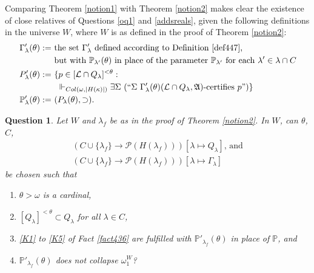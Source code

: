 \documentclass[12pt, twoside]{memoir}
\numberwithin{equation}{section}
\newtheorem{ques}[thm]{Question}
\theoremstyle{definition}
\theoremstyle{remark}
\theoremstyle{definition}
\theoremstyle{definition}
\theoremstyle{definition}
\theoremstyle{remark}
\begin{document}
Comparing Theorem \ref{notion1} with Theorem \ref{notion2} makes clear the existence of close relatives of Questions \ref{oq1} and \ref{addsreals}, given the following definitions in the universe $W$, where $W$ is as defined in the proof of Theorem \ref{notion2}:
\begin{align*}
    \Gamma'_{\lambda}(\theta) := \ & \text{the set } \Gamma'_{\lambda} \text{ defined according to Definition \ref{def447},} \\
    & \text{but with } \mathbb{P}_{\lambda'}(\theta) \text{ in place of the parameter } \mathbb{P}_{\lambda'} \text{ for each } \lambda' \in \lambda \cap C \\
    P'_{\lambda}(\theta) := \ & \{p \in [\mathcal{L} \cap Q_{\lambda}]^{< \theta} : \\
    & \ \Vdash_{Col(\omega, |H(\kappa)|)} \exists \Sigma \ (``\Sigma \ \Gamma'_{\lambda}(\theta) (\mathcal{L} \cap Q_{\lambda}, \mathfrak{A}) \text{-certifies } p")\} \\
    \mathbb{P}'_{\lambda}(\theta) := \ & (P_{\lambda}(\theta), \supset) \text{.}
\end{align*}

\begin{ques}\label{oq2}
Let $W$ and $\lambda_f$ be as in the proof of Theorem \ref{notion2}. In $W$, can $\theta$, $C$, 
\begin{gather*}
    (C \cup \{\lambda_f\} \longrightarrow \mathcal{P}(H(\lambda_f))) [\lambda \mapsto Q_{\lambda}] \text{, and} \\
    (C \cup \{\lambda_f\} \longrightarrow \mathcal{P}(H(\lambda_f))) [\lambda \mapsto \Gamma_{\lambda}]
\end{gather*}
be chosen such that 
\begin{enumerate}[label=(\arabic*)]
    \item $\theta > \omega$ is a cardinal,
    \item $[Q_{\lambda}]^{< \theta} \subset Q_{\lambda}$ for all $\lambda \in C$,
    \item \ref{K1} to \ref{K5} of Fact \ref{fact436} are fulfilled with $\mathbb{P}'_{\lambda_f}(\theta)$ in place of $\mathbb{P}$, and
    \item $\mathbb{P}'_{\lambda_f}(\theta)$ does not collapse $\omega_1^W$?
\end{enumerate}
\end{ques}
\end{document}
